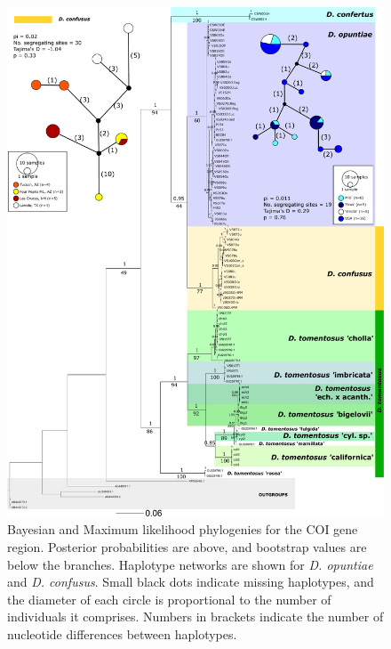 \begin{figure}[H]
	\centering
	\includegraphics[scale =0.42]{Images/Bayesian_COI_both_primers.pdf}
	\caption{Bayesian and Maximum likelihood  phylogenies for the COI gene region. Posterior probabilities are above, and bootstrap values are below the branches. Haplotype networks are shown for \textit{D. opuntiae} and \textit{D. confusus}. Small black dots indicate missing haplotypes, and the diameter of each circle is proportional to the number of individuals it comprises. Numbers in brackets indicate the number of nucleotide differences between haplotypes.} 
	\label{fig:COI_tree}
\end{figure}



